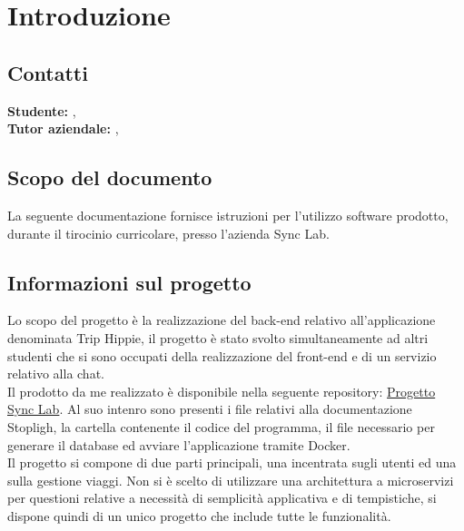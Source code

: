 \newpage
\section{Introduzione}

\subsection{Contatti}
\textbf{Studente:} \Author, \StudentMail \\
\textbf{Tutor aziendale:} \TutorAziendale, \EmailTutorAziendale \\

\subsection{Scopo del documento}
La seguente documentazione fornisce istruzioni per l'utilizzo software prodotto, durante il tirocinio curricolare, presso l'azienda Sync Lab.

\subsection{Informazioni sul progetto}
Lo scopo del progetto è la realizzazione del back-end relativo all'applicazione denominata Trip Hippie, il progetto è stato svolto simultaneamente ad altri studenti che si sono occupati della realizzazione del front-end e di un servizio relativo alla chat.\\
Il prodotto da me realizzato è disponibile nella seguente repository: \href{https://github.com/AlessandroTigani/ProgettoStageSyncLab}{Progetto Sync Lab}.
Al suo intenro sono presenti i file relativi alla documentazione Stopligh, la cartella contenente il codice del programma, il file necessario per generare il database ed avviare l'applicazione tramite Docker.\\
Il progetto si compone di due parti principali, una incentrata sugli utenti ed una sulla gestione viaggi.
Non si è scelto di utilizzare una architettura a microservizi per questioni relative a necessità di semplicità applicativa e di tempistiche, si dispone quindi di un unico progetto che include tutte le funzionalità.

